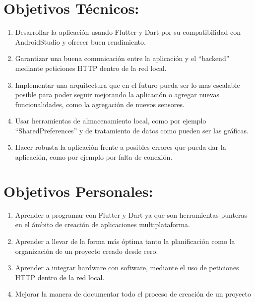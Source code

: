 \section{Objetivos Técnicos:}
\begin{enumerate}
    \item {Desarrollar la aplicación usando Flutter y Dart por su compatibilidad con AndroidStudio y ofrecer buen rendimiento.}
    \item {Garantizar una buena comunicación entre la aplicación y el ``backend'' mediante peticiones HTTP dentro de la red local.}
    \item {Implementar una arquitectura que en el futuro pueda ser lo mas escalable posible para poder seguir mejorando la aplicación o agregar nuevas funcionalidades, como la agregación de nuevos sensores.}
    \item {Usar herramientas de almacenamiento local, como por ejemplo ``SharedPreferences'' y de tratamiento de datos como pueden ser las gráficas.}
    \item {Hacer robusta la aplicación frente a posibles errores que pueda dar la aplicación, como por ejemplo por falta de conexión.}
\end{enumerate}


\section{Objetivos Personales:}
\begin{enumerate}
    \item {Aprender a programar con Flutter y Dart ya que son herramientas punteras en el ámbito de creación de aplicaciones multiplataforma.}
    \item {Aprender a llevar de la forma más óptima tanto la planificación como la organización de un proyecto creado desde cero.}
    \item {Aprender a integrar hardware con software, mediante el uso de peticiones HTTP dentro de la red local.}
    \item {Mejorar la manera de documentar todo el proceso de creación de un proyecto}
\end{enumerate}

